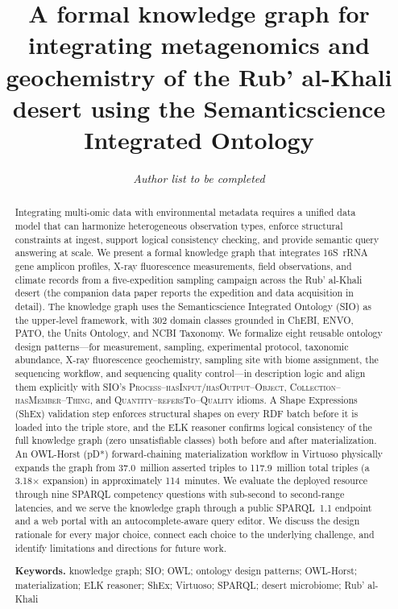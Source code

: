 \documentclass[11pt,a4paper]{article}
\title{A formal knowledge graph for integrating metagenomics and
  geochemistry of the Rub' al-Khali desert using the Semanticscience
  Integrated Ontology}
\author{\textit{Author list to be completed}}
\date{}
\begin{document}
\maketitle

\begin{abstract}
\noindent
Integrating multi-omic data with environmental metadata requires a
unified data model that can harmonize heterogeneous observation types,
enforce structural constraints at ingest, support logical consistency
checking, and provide semantic query answering at scale. We present a
formal knowledge graph that integrates 16S~rRNA gene amplicon
profiles, X-ray fluorescence measurements, field observations, and
climate records from a five-expedition sampling campaign across the
Rub' al-Khali desert (the companion data paper reports the expedition
and data acquisition in detail). The knowledge graph uses the
Semanticscience Integrated Ontology (SIO) as the upper-level
framework, with 302 domain classes grounded in ChEBI, ENVO, PATO, the
Units Ontology, and NCBI Taxonomy. We formalize eight reusable
ontology design patterns---for measurement, sampling, experimental
protocol, taxonomic abundance, X-ray fluorescence geochemistry,
sampling site with biome assignment, the sequencing workflow, and
sequencing quality control---in description logic and align them
explicitly with SIO's \textsc{Process--hasInput/hasOutput--Object},
\textsc{Collection--hasMember--Thing}, and
\textsc{Quantity--refersTo--Quality} idioms. A Shape Expressions
(ShEx) validation step enforces structural shapes on every RDF batch
before it is loaded into the triple store, and the ELK reasoner
confirms logical consistency of the full knowledge graph (zero
unsatisfiable classes) both before and after materialization. An
OWL-Horst (pD*) forward-chaining materialization workflow in Virtuoso
physically expands the graph from 37.0~million asserted triples to
117.9~million total triples (a 3.18$\times$ expansion) in
approximately 114~minutes. We evaluate the deployed resource through
nine SPARQL competency questions with sub-second to second-range
latencies, and we serve the knowledge graph through a public
SPARQL~1.1 endpoint and a web portal with an autocomplete-aware query
editor. We discuss the design rationale for every major choice,
connect each choice to the underlying challenge, and identify
limitations and directions for future work.

\vspace{0.5em}
\noindent\textbf{Keywords.} knowledge graph; SIO; OWL; ontology design
patterns; OWL-Horst; materialization; ELK reasoner; ShEx;
Virtuoso; SPARQL; desert microbiome; Rub' al-Khali
\end{abstract}
\end{document}
